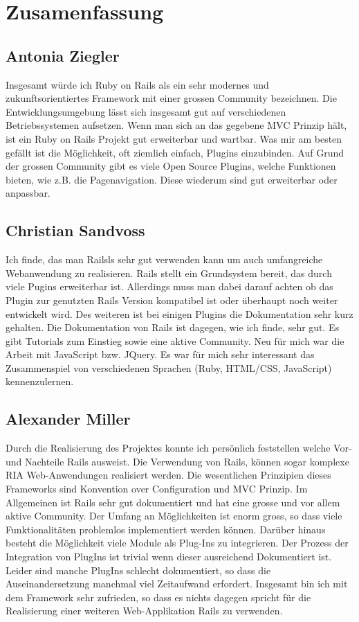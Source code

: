 \chapter{Zusamenfassung}
\label{sec:Zusammenfassung}
\section{Antonia Ziegler}
Insgesamt würde ich Ruby on Rails als ein sehr modernes und zukunftsorientiertes Framework mit einer grossen Community bezeichnen.
Die Entwicklungsumgebung lässt sich insgesamt gut auf verschiedenen Betriebssystemen aufsetzen. 
Wenn man sich an das gegebene MVC Prinzip hält, ist ein Ruby on Rails Projekt gut erweiterbar und wartbar. 
Was mir am besten gefällt ist die Möglichkeit, oft ziemlich einfach, Plugins einzubinden. Auf Grund der grossen Community gibt es viele Open Source Plugins, welche Funktionen bieten, wie z.B. die Pagenavigation. Diese wiederum sind gut erweiterbar oder anpassbar.
\section{Christian Sandvoss}
Ich finde, das man Railsls sehr gut verwenden kann um auch umfangreiche Webanwendung zu realisieren. Rails stellt ein Grundsystem bereit, das durch viele Pugins erweiterbar ist. Allerdings muss man dabei darauf achten ob das Plugin zur genutzten Rails Version kompatibel ist oder überhaupt noch weiter entwickelt wird. Des weiteren ist bei einigen Plugins die Dokumentation sehr kurz gehalten. Die Dokumentation von Rails ist dagegen, wie ich finde, sehr gut. Es gibt Tutorials zum Einstieg sowie eine aktive Community. Neu für mich war die Arbeit mit JavaScript bzw. JQuery. Es war für mich sehr interessant das Zusammenspiel von verschiedenen Sprachen (Ruby, HTML/CSS, JavaScript) kennenzulernen.

\section{Alexander Miller}
Durch die Realisierung des Projektes konnte ich persönlich feststellen welche Vor- und Nachteile Rails ausweist. Die Verwendung von Rails, können sogar komplexe RIA Web-Anwendungen realisiert werden. Die wesentlichen Prinzipien dieses Frameworks sind Konvention over Configuration und MVC Prinzip. Im Allgemeinen ist Rails sehr gut dokumentiert und hat eine grosse und vor allem aktive Community. Der Umfang an Möglichkeiten ist enorm gross, so dass viele Funktionalitäten problemlos implementiert werden können. Darüber hinaus besteht die Möglichkeit viele Module als Plug-Ins zu integrieren. Der Prozess der Integration von PlugIns ist trivial wenn dieser ausreichend Dokumentiert ist. Leider sind manche PlugIns schlecht dokumentiert, so dass die Auseinandersetzung manchmal viel Zeitaufwand erfordert. Insgesamt bin ich mit dem Framework sehr zufrieden, so dass es nichts dagegen spricht für die Realisierung einer weiteren Web-Applikation Rails zu verwenden.

